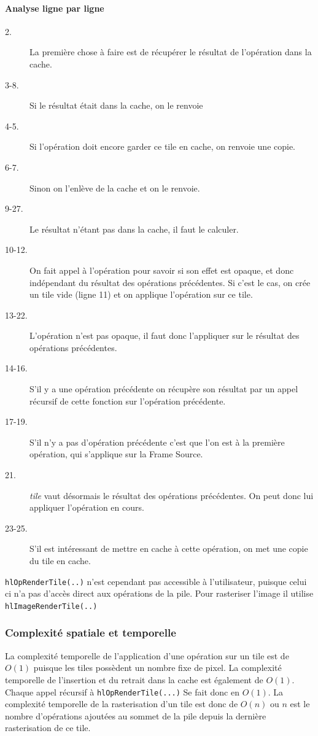 		\paragraph{Analyse ligne par ligne}
		\begin{description}
			\item[2.] La première chose à faire est de récupérer le résultat de l'opération dans la cache. 
			\item[3-8.] Si le résultat était dans la cache, on le renvoie
			\item[4-5.] Si l'opération doit encore garder ce tile en cache, on renvoie une copie.
			\item[6-7.] Sinon on l'enlève de la cache et on le renvoie.
			\item[9-27.] Le résultat n'étant pas dans la cache, il faut le calculer.
			\item[10-12.] On fait appel à l'opération pour savoir si son effet est opaque, et donc indépendant du résultat des opérations
			 précédentes. Si c'est le cas, on crée un tile vide (ligne 11) et on applique l'opération sur ce tile.
			\item[13-22.] L'opération n'est pas opaque, il faut donc l'appliquer sur le résultat des opérations précédentes.
			\item[14-16.] S'il y a une opération précédente on récupère son résultat par un appel récursif de cette fonction sur l'opération
			précédente.
			\item[17-19.] S'il n'y a pas d'opération précédente c'est que l'on est à la première opération, qui s'applique sur la Frame Source.
			\item[21.] \emph{tile} vaut désormais le résultat des opérations précédentes. On peut donc lui appliquer l'opération en cours.
			\item[23-25.] S'il est intéressant de mettre en cache à cette opération, on met une copie du tile en cache.
		\end{description}

		\lstinline$hlOpRenderTile(..)$ n'est cependant pas accessible à l'utilisateur, puisque celui ci n'a pas d'accès direct aux opérations de la pile.
		Pour rasteriser l'image il utilise \lstinline$hlImageRenderTile(..)$ 
		
		\subsubsection{Complexité spatiale et temporelle}
		La complexité temporelle de l'application d'une opération sur un tile est de $O(1)$ puisque les tiles possèdent un nombre fixe de pixel. 
		La complexité temporelle de l'insertion et du retrait dans la cache est également de $O(1)$. Chaque appel récursif à \lstinline$hlOpRenderTile(...)$
		Se fait donc en $O(1)$. La complexité temporelle de la rasterisation d'un tile est donc de $O(n)$ ou $n$ est le nombre 
		d'opérations ajoutées au sommet de la pile depuis la dernière rasterisation de ce tile. 


